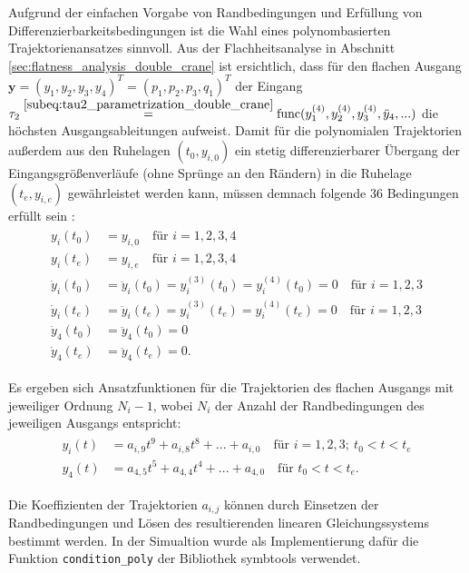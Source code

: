 Aufgrund der einfachen Vorgabe von Randbedingungen und Erfüllung von Differenzierbarkeitsbedingungen ist die Wahl eines polynombasierten Trajektorienansatzes sinnvoll. Aus der Flachheitsanalyse in Abschnitt \ref{sec:flatness_analysis_double_crane} ist ersichtlich, dass für den flachen Ausgang ${\mathbf{y} = (y_1, y_2, y_3, y_4)^T = (p_1, p_2, p_3, q_1)^T}$ der Eingang $\tau_2 \stackrel{\eqref{subeq:tau2_parametrization_double_crane}}{=} \mathrm{func}(y_1^{(4)}, y_2^{(4)}, y_3^{(4)}, \ddot{y}_4, ...)$ die höchsten Ausgangsableitungen aufweist. Damit für die polynomialen Trajektorien außerdem aus den Ruhelagen $(t_0, y_{i, 0})$  ein stetig differenzierbarer Übergang der Eingangsgrößenverläufe (ohne Sprünge an den Rändern) in die Ruhelage $(t_e, y_{i, e})$ gewährleistet werden kann, müssen demnach folgende 36 Bedingungen erfüllt sein \cite[S.~230]{NLRT_Roebenack}:
\begin{align}
	\begin{split}
	y_i(t_0) &= y_{i, 0}  \quad \text{für } i = 1,2,3,4 \\
	y_i(t_e) &= y_{i, e}  \quad \text{für } i = 1,2,3,4 \\
	\dot{y}_i(t_0) &= \ddot{y}_i(t_0) = y_i^{(3)}(t_0) = y_i^{(4)}(t_0) = 0 \quad \text{für } i = 1,2,3 \\
	\dot{y}_i(t_e) &= \ddot{y}_i(t_e) = y_i^{(3)}(t_e) = y_i^{(4)}(t_e) = 0 \quad \text{für } i = 1,2,3 \\
	\dot{y}_4(t_0) &= \ddot{y}_4(t_0) = 0 \\
	\dot{y}_4(t_e) &= \ddot{y}_4(t_e) = 0.
	\end{split}
\end{align}

Es ergeben sich Ansatzfunktionen für die Trajektorien des flachen Ausgangs mit jeweiliger Ordnung $N_i - 1$, wobei $N_i$ der Anzahl der Randbedingungen des jeweiligen Ausgangs entspricht:
\begin{align}
	\label{eq:polynomes_ref_trajectories}
	\begin{split}
	y_i(t) &= a_{i, 9} t^9 + a_{i, 8} t^8 + ... + a_{i, 0} \quad \text{für }  i = 1,2,3; \ t_0 < t < t_e \\
	y_4(t) &= a_{4, 5} t^5 + a_{4, 4} t^4 + ... + a_{4, 0} \quad \text{für } t_0 < t < t_e.
	\end{split}
\end{align}

Die Koeffizienten der Trajektorien $a_{i, j}$ können durch Einsetzen der Randbedingungen und Lösen des resultierenden linearen Gleichungssystems bestimmt werden. In der Simualtion wurde als Implementierung dafür die Funktion \texttt{condition\_poly} der Bibliothek symbtools verwendet.

